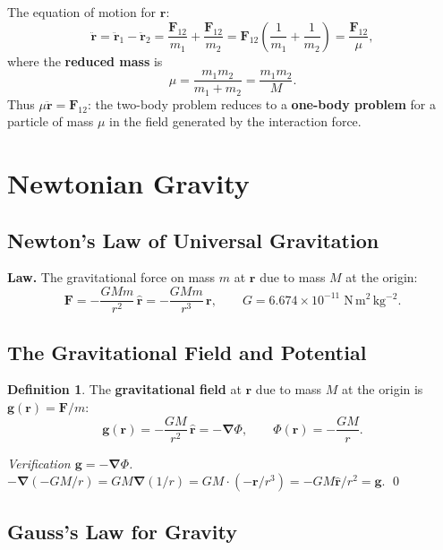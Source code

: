 \documentclass[12pt,a4paper]{article}
\theoremstyle{plain}
\theoremstyle{definition}
\newtheorem{definition}[theorem]{Definition}
\theoremstyle{remark}
\newcommand{\ve}[1]{\mathbf{#1}}           %
\newcommand{\er}{\hat{\mathbf{r}}}
\newcommand{\Fv}{\ve{F}}
\newcommand{\rv}{\ve{r}}
\newcommand{\gv}{\ve{g}}
\newcommand{\nab}{\boldsymbol{\nabla}}
\begin{document}
The equation of motion for $\rv$:
\[
  \ddot{\rv}
  = \ddot{\rv}_1 - \ddot{\rv}_2
  = \frac{\ve{F}_{12}}{m_1} + \frac{\ve{F}_{12}}{m_2}
  = \ve{F}_{12}\!\left(\frac{1}{m_1}+\frac{1}{m_2}\right)
  = \frac{\ve{F}_{12}}{\mu},
\]
where the \textbf{reduced mass} is
\[
  \boxed{\mu = \frac{m_1 m_2}{m_1+m_2} = \frac{m_1 m_2}{M}.}
\]
Thus $\mu\ddot{\rv} = \ve{F}_{12}$: the two-body problem reduces to a \textbf{one-body problem} for a particle of mass $\mu$ in the field generated by the interaction force.

\section{Newtonian Gravity}

\subsection{Newton's Law of Universal Gravitation}

\textbf{Law.} The gravitational force on mass $m$ at $\rv$ due to mass $M$ at the origin:
\[
  \Fv = -\frac{GMm}{r^2}\,\er = -\frac{GMm}{r^3}\,\rv,
  \qquad
  G = 6.674\times10^{-11}\;\mathrm{N\,m^2\,kg^{-2}}.
\]

\subsection{The Gravitational Field and Potential}

\begin{definition}
The \textbf{gravitational field} at $\rv$ due to mass $M$ at the origin is $\gv(\rv) = \Fv/m$:
\[
  \gv(\rv) = -\frac{GM}{r^2}\,\er = -\nab\Phi,
  \qquad
  \Phi(\rv) = -\frac{GM}{r}.
\]
\end{definition}

\begin{proof}[Verification $\gv = -\nab\Phi$]
$-\nab(-GM/r) = GM\nab(1/r) = GM\cdot(-\rv/r^3) = -GM\er/r^2 = \gv$. \qed
\end{proof}

\subsection{Gauss's Law for Gravity}
\end{document}
